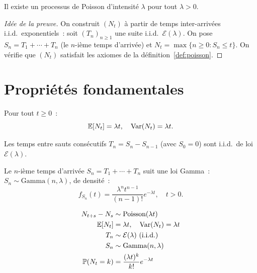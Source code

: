 \begin{theoreme}[Existence]
Il existe un processus de Poisson d'intensit\'e $\lambda$ pour tout $\lambda > 0$.
\end{theoreme}

\begin{proof}[Id\'ee de la preuve]
On construit $(N_t)$ \`a partir de temps inter-arriv\'ees i.i.d.\ exponentiels~:
soit $(T_n)_{n \geq 1}$ une suite i.i.d.\ $\mathcal{E}(\lambda)$. On pose
$S_n = T_1 + \cdots + T_n$ (le $n$-i\`eme temps d'arriv\'ee) et
$N_t = \max\{n \geq 0 : S_n \leq t\}$. On v\'erifie que $(N_t)$ satisfait les
axiomes de la d\'efinition~\ref{def:poisson}.
\end{proof}

\section{Propri\'et\'es fondamentales}

\begin{proposition}[Moments]
Pour tout $t \geq 0$~:
\[
  \mathbb{E}[N_t] = \lambda t, \quad \mathrm{Var}(N_t) = \lambda t.
\]
\end{proposition}

\begin{proposition}
Les temps entre sauts cons\'ecutifs $T_n = S_n - S_{n-1}$ (avec $S_0 = 0$) sont
i.i.d.\ de loi $\mathcal{E}(\lambda)$.
\end{proposition}

\begin{proposition}
Le $n$-i\`eme temps d'arriv\'ee $S_n = T_1 + \cdots + T_n$ suit une loi Gamma~:
$S_n \sim \text{Gamma}(n, \lambda)$, de densit\'e~:
\[
  f_{S_n}(t) = \frac{\lambda^n t^{n-1}}{(n-1)!} e^{-\lambda t}, \quad t > 0.
\]
\end{proposition}

\begin{formules}[title=\textbf{Propri\'et\'es du processus de Poisson}]
\begin{align*}
  N_{t+s} - N_s &\sim \text{Poisson}(\lambda t) \\
  \mathbb{E}[N_t] &= \lambda t, \quad \mathrm{Var}(N_t) = \lambda t \\
  T_n &\sim \mathcal{E}(\lambda) \text{ (i.i.d.)} \\
  S_n &\sim \text{Gamma}(n, \lambda) \\
  \mathbb{P}(N_t = k) &= \frac{(\lambda t)^k}{k!} e^{-\lambda t}
\end{align*}
\end{formules}

